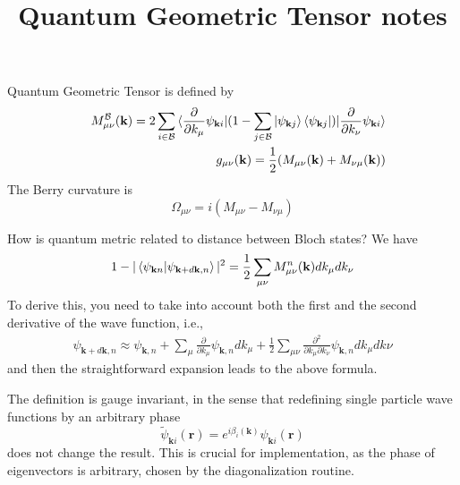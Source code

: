 \documentclass[onecolumn, prb,preprintnumbers,amsmath,amssymb,floatfix]{revtex4}
\renewcommand{\vr}{{\mathbf{r}}}
\newcommand{\vk}{{\mathbf{k}}}
\newcommand{\cb}{{\cal B}}
\begin{document}
\setlength{\pdfpageheight}{\paperheight}
\setlength{\pdfpagewidth}{\paperwidth}

\title{Quantum Geometric Tensor notes}

Quantum Geometric Tensor is defined by
\begin{eqnarray}
&&  M_{\mu\nu}^{\cb}(\vk)  =2\sum_{i\in \cb}
\braket{\frac{\partial}{\partial k_{\mu}}\psi_{\vk i}|(1-\sum_{j\in \cb}\ket{\psi_{\vk j}}\bra{\psi_{\vk j}})|\frac{\partial}{\partial k_{\nu}}\psi_{\vk i}}\\
&&  g_{\mu\nu}(\vk) = \frac{1}{2}(M_{\mu\nu}(\vk)+M_{\nu\mu}(\vk))\\
\end{eqnarray}
The Berry curvature is
\begin{equation}
\Omega_{\mu\nu} = i(M_{\mu\nu}-M_{\nu\mu}) 
\end{equation}

How is quantum metric related to distance between Bloch states? We have
\begin{eqnarray}
1-|\braket{\psi_{\vk n}|\psi_{\vk+d\vk,n}}|^2 =\frac{1}{2}\sum_{\mu\nu} M_{\mu\nu}^n(\vk) dk_\mu dk_\nu
\end{eqnarray}  
To derive this, you need to take into account both the first and the second derivative of the wave function, i.e.,
\begin{eqnarray}
  \psi_{\vk+d\vk,n}\approx \psi_{\vk,n} +
 \sum_{\mu}\frac{\partial}{\partial k_\mu}\psi_{\vk,n}dk_\mu +
 \frac{1}{2}\sum_{\mu\nu}\frac{\partial^2}{\partial k_\mu\partial k_\nu}\psi_{\vk,n}dk_\mu dk\nu
\end{eqnarray}
and then the straightforward expansion leads to the above formula.


The definition is gauge invariant, in the sense that redefining single particle wave functions by an arbitrary phase
$$\widetilde{\psi}_{\vk i}(\vr)=e^{i\beta_i(\vk)}\psi_{\vk i}(\vr)$$ does not change the result. This is crucial for implementation, as the phase of eigenvectors is arbitrary, chosen by the diagonalization routine.
\end{document}
